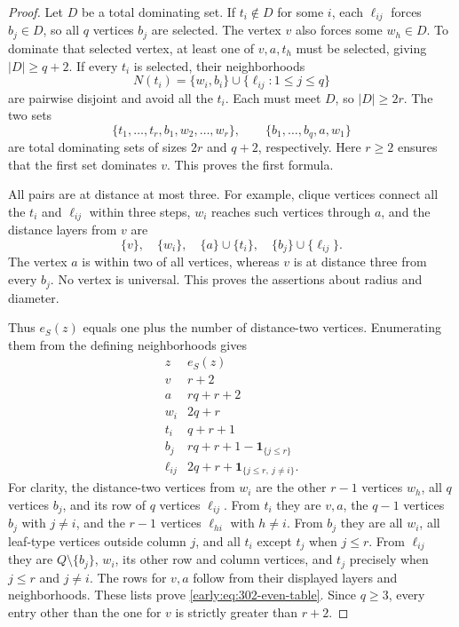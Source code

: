 \documentclass[11pt,a4paper]{article}
\theoremstyle{definition}\newtheorem{definition}[theorem]{Definition}
\theoremstyle{remark}\newtheorem{remark}[theorem]{Remark}
\begin{document}
\begin{proof}
Let $D$ be a total dominating set.  If $t_i\notin D$ for some $i$,
each $\ell_{ij}$ forces $b_j\in D$, so all $q$ vertices $b_j$ are
selected.  The vertex $v$ also forces some $w_h\in D$.  To dominate
that selected vertex, at least one of $v,a,t_h$ must be selected,
giving $|D|\geq q+2$.  If every $t_i$ is selected, their neighborhoods
\[
 N(t_i)=\{w_i,b_i\}\cup\{\ell_{ij}:1\leq j\leq q\}
\]
are pairwise disjoint and avoid all the $t_i$.  Each must meet $D$,
so $|D|\geq2r$.  The two sets
\[
 \{t_1,\ldots,t_r,b_1,w_2,\ldots,w_r\},\qquad
 \{b_1,\ldots,b_q,a,w_1\}
\]
are total dominating sets of sizes $2r$ and $q+2$, respectively.
Here $r\geq2$ ensures that the first set dominates $v$.
This proves the first formula.

All pairs are at distance at most three.  For example, clique
vertices connect all the $t_i$ and $\ell_{ij}$ within three steps,
$w_i$ reaches such vertices through $a$, and the distance layers from
$v$ are
\[
 \{v\},\quad \{w_i\},\quad\{a\}\cup\{t_i\},
 \quad\{b_j\}\cup\{\ell_{ij}\}.
\]
The vertex $a$ is within two of all vertices, whereas $v$ is at
distance three from every $b_j$.  No vertex is universal.  This
proves the assertions about radius and diameter.

Thus $e_S(z)$ equals one plus the number of distance-two vertices.
Enumerating them from the defining neighborhoods gives
\begin{equation}
\begin{array}{c|l}
 z&e_S(z)\\\hline
 v&r+2\\
 a&rq+r+2\\
 w_i&2q+r\\
 t_i&q+r+1\\
 b_j&rq+r+1-\mathbf1_{\{j\leq r\}}\\
 \ell_{ij}&2q+r+\mathbf1_{\{j\leq r,\ j\ne i\}}.
\end{array}
\label{early:eq:302-even-table}
\end{equation}
For clarity, the distance-two vertices from $w_i$ are the other
$r-1$ vertices $w_h$, all $q$ vertices $b_j$, and its row of $q$
vertices $\ell_{ij}$.  From $t_i$ they are $v,a$, the $q-1$ vertices
$b_j$ with $j\ne i$, and the $r-1$ vertices $\ell_{hi}$ with
$h\ne i$.  From $b_j$ they are all $w_i$, all leaf-type vertices
outside column $j$, and all $t_i$ except $t_j$ when $j\leq r$.
From $\ell_{ij}$ they are $Q\setminus\{b_j\}$, $w_i$, its other
row and column vertices, and $t_j$ precisely when $j\leq r$ and
$j\ne i$.  The rows for $v,a$ follow from their displayed layers
and neighborhoods.  These lists prove
\eqref{early:eq:302-even-table}.  Since $q\geq3$, every entry other
than the one for $v$ is strictly greater than $r+2$.


\end{proof}
\end{document}
